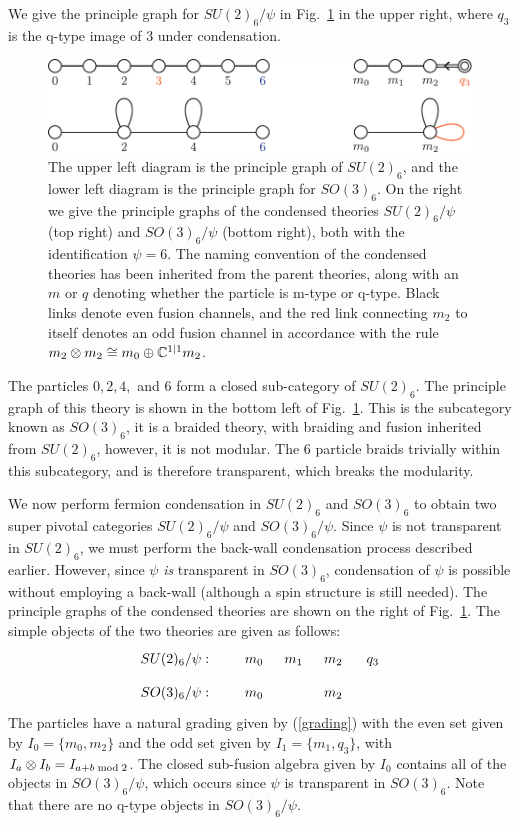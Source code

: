 We give the principle graph for $SU(2)_6/\psi$ in Fig.~\ref{SUSOsix} in the upper right, where $q_3$ is the q-type image of $3$ under condensation.
\begin{figure} 
\centering
\includegraphics{SU26SO36Dynkin.pdf}
\caption{\label{SUSOsix} The upper left diagram is the principle graph of $SU(2)_6$, and the 
lower left diagram is the principle graph for $SO(3)_6$. 
On the right we give the principle graphs of the condensed theories $SU(2)_6/\psi$ (top right) and 
$SO(3)_6/\psi$ (bottom right), both with the identification $\psi=6$. 
The naming convention of the condensed theories has been inherited from the parent theories, 
along with an $m$ or $q$ denoting whether the particle is m-type or q-type.
Black links denote even fusion channels, and the red link connecting $m_2$ to itself 
denotes an odd fusion channel in accordance with the rule $m_2\otimes m_2 \cong m_0 \oplus \mathbb{C}^{1|1}m_2$. 
}
\end{figure}
The particles $0,2,4,$ and $6$ form a closed sub-category of $SU(2)_6$. 
The principle graph of this theory is shown in the bottom left of Fig.~\ref{SUSOsix}. 
This is the subcategory known as $SO(3)_6$, it is a braided theory, with braiding and 
fusion inherited from $SU(2)_6$, however, it is not modular.
The $6$ particle braids trivially within this subcategory, and is therefore transparent, 
which breaks the modularity.

We now perform fermion condensation in $SU(2)_6$ and $SO(3)_6$ to obtain two super pivotal 
categories $SU(2)_6/\psi$ and $SO(3)_6/\psi$. 
Since $\psi$ is not transparent in $SU(2)_6$, we must perform the back-wall condensation 
process described earlier. 
However, since $\psi$ {\it is} transparent in $SO(3)_6$, condensation of $\psi$ is possible 
without employing a back-wall (although a spin structure is still needed). 
The principle graphs of the condensed theories are shown on the right of Fig.~\ref{SUSOsix}.
The simple objects of the two theories are given as follows:
\begin{align}
\xymatrix @!0 @M=1mm @C=10mm {
SU(2)_6/\psi:&&m_0 & m_1 & m_2 & q_3 \\
SO(3)_6/ \psi:&&m_0 && m_2& 
}
\end{align}
The particles have a natural grading given by (\ref{grading}) with the even set given by 
$I_0 = \{ m_0, m_2 \}$ and the odd set given by $I_1 = \{m_1, q_3\}$, with $I_a \otimes I_b = I_{a+b \;  \text{mod} \; 2}$.
The closed sub-fusion algebra given by $I_0$ contains all of the objects in $SO(3)_6/\psi$, 
which occurs since $\psi$ is transparent in $SO(3)_6$. 
Note that there are no q-type objects in $SO(3)_6/\psi$. 

